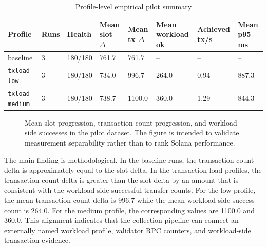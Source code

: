 \documentclass[11pt,a4paper]{article}
\begin{document}
\begin{table}[H]
\centering
\caption{Profile-level empirical pilot summary}
\label{tab:pilot-profile-summary}
\begin{tabularx}{\textwidth}{L{2.7cm}L{1.2cm}L{1.5cm}L{1.6cm}L{1.8cm}L{1.8cm}L{1.8cm}L{1.8cm}}
\toprule
\textbf{Profile} & \textbf{Runs} & \textbf{Health} & \textbf{Mean slot $\Delta$} & \textbf{Mean tx $\Delta$} & \textbf{Mean workload ok} & \textbf{Achieved tx/s} & \textbf{Mean p95 ms} \\
\midrule
baseline & 3 & 180/180 & 761.7 & 761.7 & -- & -- & -- \\
\texttt{txload-low} & 3 & 180/180 & 734.0 & 996.7 & 264.0 & 0.94 & 887.3 \\
\texttt{txload-medium} & 3 & 180/180 & 738.7 & 1100.0 & 360.0 & 1.29 & 844.3 \\
\bottomrule
\end{tabularx}
\end{table}

\begin{figure}[H]
\centering
{}
\caption{Mean slot progression, transaction-count progression, and workload-side successes in the pilot dataset. The figure is intended to validate measurement separability rather than to rank Solana performance.}
\label{fig:pilot-profile-deltas}
\end{figure}

The main finding is methodological. In the baseline runs, the transaction-count delta is approximately equal to the slot delta. In the transaction-load profiles, the transaction-count delta is greater than the slot delta by an amount that is consistent with the workload-side successful transfer counts. For the low profile, the mean transaction-count delta is 996.7 while the mean workload-side success count is 264.0. For the medium profile, the corresponding values are 1100.0 and 360.0. This alignment indicates that the collection pipeline can connect an externally named workload profile, validator RPC counters, and workload-side transaction evidence.
\end{document}
